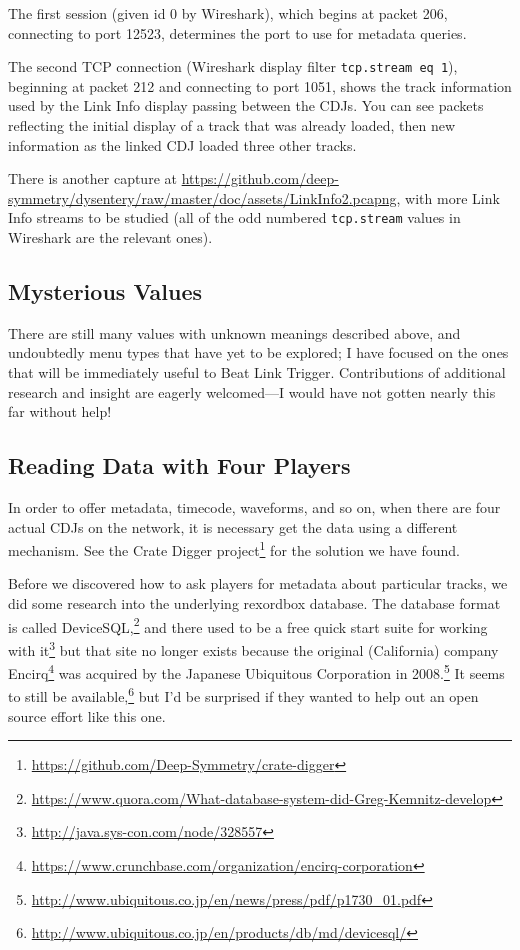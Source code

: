 \documentclass[11pt]{article}
\begin{document}
The first session (given id 0 by Wireshark), which begins at packet
206, connecting to port 12523, determines the port to use for metadata
queries.

The second TCP connection (Wireshark display filter {\tt tcp.stream eq
  1}), beginning at packet 212 and connecting to port 1051, shows the
track information used by the Link Info display passing between the
CDJs. You can see packets reflecting the initial display of a track
that was already loaded, then new information as the linked CDJ loaded
three other tracks.

There is another capture at
\url{https://github.com/deep-symmetry/dysentery/raw/master/doc/assets/LinkInfo2.pcapng},
with more Link Info streams to be studied (all of the odd numbered
{\tt tcp.stream} values in Wireshark are the relevant ones).

\subsection{Mysterious Values}

There are still many values with unknown meanings described above, and
undoubtedly menu types that have yet to be explored; I have focused on
the ones that will be immediately useful to Beat Link Trigger.
Contributions of additional research and insight are eagerly
welcomed---I would have not gotten nearly this far without help!

\subsection{Reading Data with Four Players}

In order to offer metadata, timecode, waveforms, and so on, when there
are four actual CDJs on the network, it is necessary get the data
using a different mechanism. See the Crate Digger
project\footnote{\url{https://github.com/Deep-Symmetry/crate-digger}}
for the solution we have found.

Before we discovered how to ask players for metadata about
particular tracks, we did some research into the underlying rexordbox
database. The database format is called
DeviceSQL,\footnote{\url{https://www.quora.com/What-database-system-did-Greg-Kemnitz-develop}}
and there used to be a free quick start suite for working with
it\footnote{\url{http://java.sys-con.com/node/328557}} but that site
no longer exists because the original (California) company
Encirq\footnote{\url{https://www.crunchbase.com/organization/encirq-corporation}}
was acquired by the Japanese Ubiquitous Corporation in
2008.\footnote{\url{http://www.ubiquitous.co.jp/en/news/press/pdf/p1730_01.pdf}}
It seems to still be
available,\footnote{\url{http://www.ubiquitous.co.jp/en/products/db/md/devicesql/}}
but I'd be surprised if they wanted to help out an open source effort
like this one.
\end{document}
